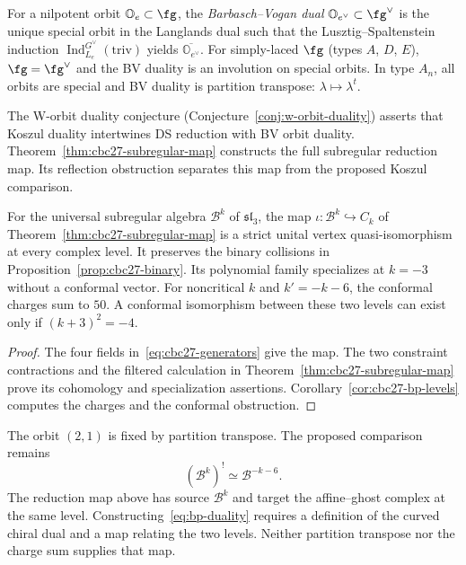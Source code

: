 \begin{definition}
\label{def:bv-dual}
For a nilpotent orbit $\mathbb{O}_e \subset \fg$, the
\emph{Barbasch--Vogan dual} $\mathbb{O}_{e^\vee} \subset \fg^\vee$ is
the unique special orbit in the Langlands dual such that
the Lusztig--Spaltenstein induction
$\operatorname{Ind}_{L_e}^{G^\vee}(\mathrm{triv})$ yields
$\overline{\mathbb{O}_{e^\vee}}$.  For simply-laced $\fg$
(types $A$, $D$, $E$), $\fg = \fg^\vee$ and the BV duality is an
involution on special orbits.  In type $A_n$, all orbits are special
and BV duality is partition transpose: $\lambda \mapsto \lambda^t$.
\end{definition}

The W-orbit duality conjecture (Conjecture~\ref{conj:w-orbit-duality})
asserts that Koszul duality intertwines DS reduction with BV orbit duality.
Theorem~\ref{thm:cbc27-subregular-map} constructs the full subregular reduction map.
Its reflection obstruction separates this map from the proposed Koszul comparison.

\begin{proposition}\label{prop:bp-duality}
For the universal subregular algebra $\mathcal B^k$ of $\mathfrak{sl}_3$, the map
$\iota:\mathcal B^k\hookrightarrow C_k$ of Theorem~\ref{thm:cbc27-subregular-map}
is a strict unital vertex quasi-isomorphism at every complex level.
It preserves the binary collisions in Proposition~\ref{prop:cbc27-binary}.
Its polynomial family specializes at $k=-3$ without a conformal vector.
For noncritical $k$ and $k'=-k-6$, the conformal charges sum to $50$.
A conformal isomorphism between these two levels can exist only if $(k+3)^2=-4$.
\end{proposition}
\begin{proof}
The four fields in~\eqref{eq:cbc27-generators} give the map.
The two constraint contractions and the filtered calculation in Theorem~\ref{thm:cbc27-subregular-map}
prove its cohomology and specialization assertions.
Corollary~\ref{cor:cbc27-bp-levels} computes the charges and the conformal obstruction.
\end{proof}

\begin{remark}
The orbit $(2,1)$ is fixed by partition transpose.
The proposed comparison remains
\begin{equation}\label{eq:bp-duality}
 (\mathcal B^k)^!\simeq\mathcal B^{-k-6}.
\end{equation}
The reduction map above has source $\mathcal B^k$ and target the affine--ghost complex at the same level.
Constructing~\eqref{eq:bp-duality} requires a definition of the curved chiral dual and a map relating the two levels.
Neither partition transpose nor the charge sum supplies that map.
\end{remark}

